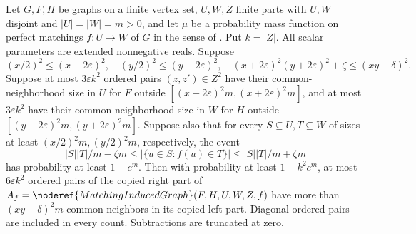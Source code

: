 \begin{lemma}
Let $G,F,H$ be graphs on a finite vertex set, $U,W,Z$ finite parts with
$U,W$ disjoint and $|U|=|W|=m>0$, and let $\mu$ be a probability mass
function on perfect matchings $f:U\to W$ of $G$ in the sense of
. Put $k=|Z|$. All scalar parameters are
extended nonnegative reals. Suppose
\[
 (x/2)^2\leq(x-2\varepsilon)^2,\quad
 (y/2)^2\leq(y-2\varepsilon)^2,\quad
 (x+2\varepsilon)^2(y+2\varepsilon)^2+\zeta\leq(xy+\delta)^2.
\]
Suppose at most $3\varepsilon k^2$ ordered pairs $(z,z')\in Z^2$
have their common-neighborhood size in $U$ for $F$ outside
$[(x-2\varepsilon)^2m,(x+2\varepsilon)^2m]$, and at most
$3\varepsilon k^2$ have their common-neighborhood size in $W$ for $H$
outside $[(y-2\varepsilon)^2m,(y+2\varepsilon)^2m]$.
Suppose also that for every $S\subseteq U,T\subseteq W$ of sizes at least
$(x/2)^2m,(y/2)^2m$, respectively, the event
\[
 |S||T|/m-\zeta m\leq |\{u\in S:f(u)\in T\}|
 \leq |S||T|/m+\zeta m
\]
has probability at least $1-c^m$.
Then with probability at least $1-k^2c^m$, at most
$6\varepsilon k^2$ ordered pairs of the copied right part of
$A_f=\noderef{MatchingInducedGraph}(F,H,U,W,Z,f)$ have more than
$(xy+\delta)^2m$ common neighbors in its copied left part.
Diagonal ordered pairs are included in every count. Subtractions are
truncated at zero.
\end{lemma}

